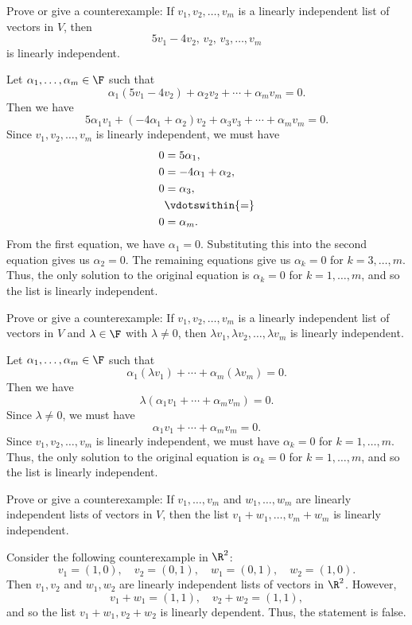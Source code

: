 \begin{exercise}
Prove or give a counterexample: If $v_1,v_2,\dots,v_m$ is a linearly
independent list of vectors in $V$, then
\[ 5v_1-4v_2,\,v_2,\,v_3,\dots,v_m \]
is linearly independent.
\end{exercise}
\begin{solution}
Let $\alpha_1,\dots,\alpha_m\in\F$ such that
\[ \alpha_1(5v_1-4v_2)+\alpha_2v_2+\cdots+\alpha_mv_m=0. \]
Then we have
\[ 5\alpha_1v_1+(-4\alpha_1+\alpha_2)v_2+\alpha_3v_3+\cdots+\alpha_mv_m=0. \]
Since $v_1,v_2,\dots,v_m$ is linearly independent, we must have
\begin{align*}
0 &= 5\alpha_1,\\
0 &= -4\alpha_1+\alpha_2,\\
0 &= \alpha_3,\\
  &\vdotswithin{=}\\
0 &= \alpha_m.
\end{align*}
From the first equation, we have $\alpha_1=0$. Substituting this into the
second equation gives us $\alpha_2=0$. The remaining equations give us
$\alpha_k=0$ for $k=3,\dots,m$. Thus, the only solution to the original
equation is $\alpha_k=0$ for $k=1,\dots,m$, and so the list is linearly
independent.
\end{solution}

\begin{exercise}
Prove or give a counterexample: If $v_1,v_2,\dots,v_m$ is a linearly
independent list of vectors in $V$ and $\lambda\in\F$ with $\lambda\ne0$, then
$\lambda v_1,\lambda v_2,\dots,\lambda v_m$ is linearly independent.
\end{exercise}
\begin{solution}
Let $\alpha_1,\dots,\alpha_m\in\F$ such that
\[ \alpha_1(\lambda v_1)+\cdots+\alpha_m(\lambda v_m)=0. \]
Then we have
\[ \lambda(\alpha_1v_1+\cdots+\alpha_mv_m)=0. \]
Since $\lambda\ne0$, we must have
\[ \alpha_1v_1+\cdots+\alpha_mv_m=0. \]
Since $v_1,v_2,\dots,v_m$ is linearly independent, we must have $\alpha_k=0$
for $k=1,\dots,m$. Thus, the only solution to the original equation is
$\alpha_k=0$ for $k=1,\dots,m$, and so the list is linearly independent.
\end{solution}

\begin{exercise}
Prove or give a counterexample: If $v_1,\dots,v_m$ and $w_1,\dots,w_m$ are
linearly independent lists of vectors in $V$, then the list
$v_1+w_1,\dots,v_m+w_m$ is linearly independent.
\end{exercise}
\begin{solution}
Consider the following counterexample in $\R^2$:
\[ v_1=(1,0), \quad v_2=(0,1), \quad w_1=(0,1), \quad w_2=(1,0). \]
Then $v_1,v_2$ and $w_1,w_2$ are linearly independent lists of vectors in
$\R^2$. However,
\[ v_1+w_1=(1,1), \quad v_2+w_2=(1,1), \]
and so the list $v_1+w_1,v_2+w_2$ is linearly dependent. Thus, the statement
is false.
\end{solution}

